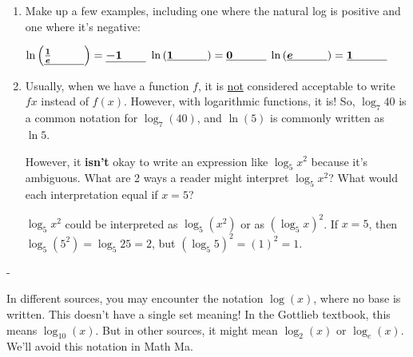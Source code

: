 \documentclass{article}
\makeatletter
\newlength{\tipmargin}
\renewenvironment{framed}{
  \setlength{\tipmargin}{\textwidth-\linewidth}
  \advance\@totalleftmargin-\tipmargin
  \def\FrameCommand{\hspace{\tipmargin}\fbox}%
  \advance\linewidth\tipmargin
  \MakeFramed {\advance\hsize-\width \FrameRestore}%
}
{\endMakeFramed}
\makeatother
\begin{document}
\begin{enumerate}[resume]
\item  Make up a few examples, including one where the natural log is positive and one where it's negative:

  $\ln \left( \fitb{0.5in}{\frac{1}{e}} \right) = \fitb{0.5in}{-1}$
  \qquad $\ln \left( \fitb{0.5in}{1} \right) = \fitb{0.5in}{0}$ \qquad $\ln \left( \fitb{0.5in}{e} \right) = \fitb{0.5in}{1}$

  \pspace{0.25in}

  \pspace{\newpage}

\item 
  \begin{problem}[\stretch{1.25}]
    Usually, when we have a function $f$, it is \uline{not} considered acceptable to write $f x$ instead of $f(x)$. However, with logarithmic functions, it is! So, $\log_7 40$ is a common notation for $\log_7(40)$, and $\ln(5)$ is commonly written as $\ln 5$.

    However, it \textbf{isn't} okay to write an expression like $\log_5 x^2$ because it's ambiguous. What are 2 ways a reader might interpret $\log_5 x^2$? What would each interpretation equal if $x = 5$?
  \end{problem}

  \begin{solution}
    $\log_5 x^2$ could be interpreted as $\log_5 (x^2)$ or as
    $(\log_5 x)^2$. If $x=5$, then $\log_5 (5^2)=\log_5 25 = 2$,
    but $(\log_5 5)^2 = (1)^2 = 1.$
  \end{solution}

\end{enumerate}
\begin{framed}
  \danger In different sources, you may encounter the notation $\log(x)$, where no base is written. This doesn't have a single set meaning! In the Gottlieb textbook, this means $\log_{10} (x)$. But in other sources, it might mean $\log_2 (x)$ or $\log_e (x)$. We'll avoid this notation in Math Ma. 
\end{framed}
\end{document}
